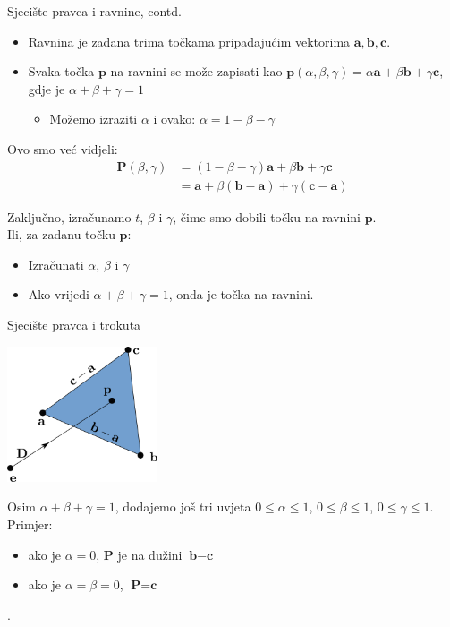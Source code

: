 \documentclass[9pt]{beamer}
\begin{document}
\begin{frame}{Sjecište pravca i ravnine, contd.}
	\begin{itemize}
		\item Ravnina je zadana trima točkama pripadajućim vektorima $\mathbf{a}, \mathbf{b}, \mathbf{c}$.
		\item Svaka točka $\mathbf{p}$ na ravnini se može zapisati kao  $\mathbf{p}(\alpha, \beta, \gamma) = \alpha\mathbf{a} + \beta\mathbf{b}+\gamma\mathbf{c}$, gdje je $\alpha + \beta +\gamma =1$
		\begin{itemize}
			\item Možemo izraziti $\alpha$ i ovako: $\alpha = 1- \beta - \gamma$
		\end{itemize}
	\end{itemize}
	
	Ovo smo već vidjeli:
	\begin{align*}
	\mathbf{P}(\beta, \gamma) & = (1- \beta - \gamma)\mathbf{a} + \beta\mathbf{b}+\gamma\mathbf{c} \\
	& = \mathbf{a} + \beta(\mathbf{b}-\mathbf{a}) + \gamma(\mathbf{c}-\mathbf{a})
	\end{align*}	
	
	Zaključno, izračunamo $t$, $\beta$ i $\gamma$, čime smo dobili točku na ravnini $\mathbf{p}$.\\
	Ili, za zadanu točku $\mathbf{p}$:
	\begin{itemize}
		\item Izračunati $\alpha$, $\beta$ i $\gamma$
		\item Ako vrijedi $\alpha + \beta +\gamma =1$, onda je točka na ravnini.
	\end{itemize}
\end{frame}

\begin{frame}{Sjecište pravca i trokuta}
	\begin{center}
		\includegraphics[height=4cm]{./slike/sjeciste_trokut_pravac.png}
	\end{center}
	Osim $\alpha + \beta +\gamma =1$, dodajemo još tri uvjeta $0 \leq \alpha \leq 1$, $0 \leq \beta \leq 1$, $0 \leq \gamma \leq 1$.\\
	Primjer: 
	\begin{itemize}
		\item ako je $\alpha=0$, $\textbf{P}$ je na dužini $\textbf{b} - \textbf{c}$
		\item ako je $\alpha=\beta=0$, $\textbf{P} = \textbf{c}$
	\end{itemize}
	
	.
\end{frame}
\end{document}
